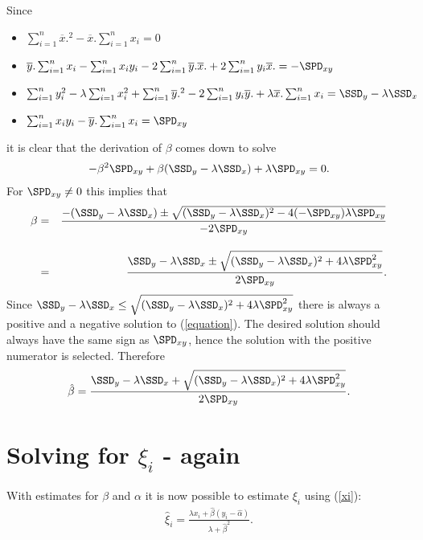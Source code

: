 \documentclass[a4paper,twoside,12pt]{article}
\begin{document}
Since
\begin{itemize}
\item
$\sum_{i=1}^n\overline{x}.^2
-\overline{x}.\sum_{i=1}^nx_i=0$
\item
$\overline{y}.\sum_{i=1}^nx_i
-\sum_{i=1}^nx_iy_i
-2\sum_{i=1}^n\overline{y}.\overline{x}.
+2\sum_{i=1}^ny_i\overline{x}.=-\SPD_{xy}$
\item
$\sum_{i=1}^ny_i^2
-\lambda\sum_{i=1}^nx_i^2
+\sum_{i=1}^n\overline{y}.^2
-2\sum_{i=1}^ny_i\overline{y}.
+\lambda\overline{x}.\sum_{i=1}^nx_i
=\SSD_y-\lambda\SSD_x$
\item
$\sum_{i=1}^nx_iy_i
-\overline{y}.\sum_{i=1}^nx_i=\SPD_{xy}$
\end{itemize}
it is clear that the derivation of $\beta$ comes down to solve
\begin{eqnarray}\label{equation}
-\beta^2\SPD_{xy}+\beta(\SSD_y-\lambda\SSD_x)+\lambda\SPD_{xy}=0.
\end{eqnarray}
For $\SPD_{xy}\neq 0$ this implies that
\begin{eqnarray*}
\beta
&=&
\frac{-(\SSD_y-\lambda\SSD_x)\pm\sqrt{(\SSD_y-\lambda\SSD_x)^2-4(-\SPD_{xy})\lambda\SPD_{xy}}}{-2\SPD_{xy}}\\[1em]
&=&
\frac{\SSD_y-\lambda\SSD_x\pm\sqrt{(\SSD_y-\lambda\SSD_x)^2+4\lambda\SPD_{xy}^2}}{2\SPD_{xy}}.
\end{eqnarray*}
Since $\SSD_y-\lambda\SSD_x\leq
\sqrt{(\SSD_y-\lambda\SSD_x)^2+4\lambda\SPD_{xy}^2}$ there is always a
positive and a negative solution to (\ref{equation}). The desired solution should always have the same sign as $\SPD_{xy}$, hence the solution with the positive numerator is selected. Therefore
\begin{eqnarray*}
\hat{\beta}=\frac{\SSD_y-\lambda\SSD_x+\sqrt{(\SSD_y-\lambda\SSD_x)^2+4\lambda\SPD_{xy}^2}}{2\SPD_{xy}}.
\end{eqnarray*}



\section{Solving for $\xi_i$ - again}
With estimates for $\beta$ and $\alpha$ it is now possible to estimate $\xi_i$ using (\ref{xi}):
\begin{eqnarray*}
\hat{\xi}_i=\frac{\lambda x_i+\hat{\beta}(y_i-\hat{\alpha})}{\lambda+\hat{\beta}^2}.
\end{eqnarray*}
\end{document}

